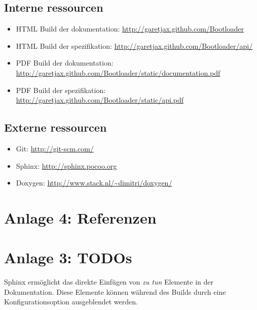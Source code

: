 \documentclass[letterpaper,10pt,ngerman]{manual}
\begin{document}
\subsection{Interne ressourcen}
\begin{itemize}
\item {} 
HTML Build der dokumentation: \href{http://garetjax.github.com/Bootloader}{http://garetjax.github.com/Bootloader}

\item {} 
HTML Build der spezifikation: \href{http://garetjax.github.com/Bootloader/api/}{http://garetjax.github.com/Bootloader/api/}

\item {} 
PDF Build der dokumentation: \href{http://garetjax.github.com/Bootloader/static/documentation.pdf}{http://garetjax.github.com/Bootloader/static/documentation.pdf}

\item {} 
PDF Build der spezifikation: \href{http://garetjax.github.com/Bootloader/static/api.pdf}{http://garetjax.github.com/Bootloader/static/api.pdf}

\end{itemize}


\subsection{Externe ressourcen}
\begin{itemize}
\item {} 
Git: \href{http://git-scm.com/}{http://git-scm.com/}

\item {} 
Sphinx: \href{http://sphinx.pocoo.org}{http://sphinx.pocoo.org}

\item {} 
Doxygen: \href{http://www.stack.nl/~dimitri/doxygen/}{http://www.stack.nl/\textasciitilde{}dimitri/doxygen/}

\end{itemize}


\section{Anlage 4: Referenzen}
\hypertarget{todo-1}{}

\section{Anlage 3: TODOs}

Sphinx ermöglicht das direkte Einfügen von \emph{zu tun} Elemente in der Dokumentation.
Diese Elemente können während des Builds durch eine Konfigurationsoption ausgeblendet werden.
\end{document}
